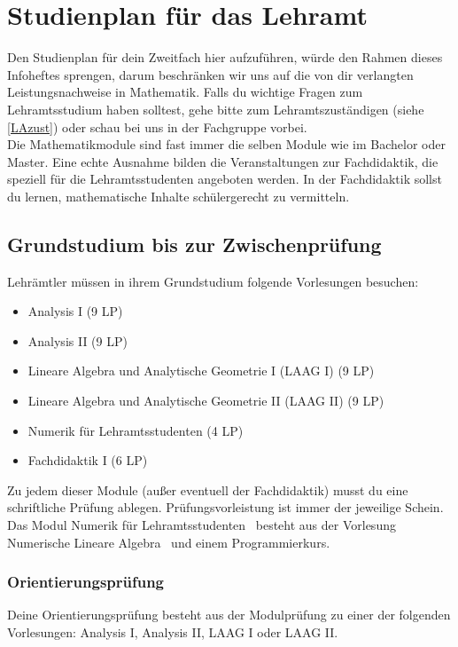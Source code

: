 \section{Studienplan für das Lehramt}
\label{LA}
Den Studienplan für dein Zweitfach
hier aufzuführen, würde den Rahmen
dieses Infoheftes sprengen,
darum beschränken wir uns auf die
von dir verlangten Leistungsnachweise in Mathematik.
Falls du wichtige Fragen zum Lehramtsstudium haben solltest,
gehe bitte zum Lehramtszuständigen (siehe \ref{LAzust})
oder schau bei uns in der Fachgruppe vorbei.\\

Die Mathematikmodule sind fast immer die selben Module
wie im Bachelor oder Master.
Eine echte Ausnahme bilden die Veranstaltungen zur Fachdidaktik,
die speziell für die Lehramtsstudenten angeboten werden.
In der Fachdidaktik sollst du lernen,
mathematische Inhalte schülergerecht zu vermitteln.


\subsection{Grundstudium bis zur Zwischenprüfung}

Lehrämtler müssen in ihrem Grundstudium folgende Vorlesungen besuchen:
\begin{itemize}
\item Analysis I (9 LP)
\item Analysis II (9 LP)
\item Lineare Algebra und Analytische Geometrie I (LAAG I) (9 LP)
\item Lineare Algebra und Analytische Geometrie II (LAAG II) (9 LP)
\item Numerik für Lehramtsstudenten (4 LP)
\item Fachdidaktik I (6 LP)
\end{itemize}

Zu jedem dieser Module (außer eventuell der Fachdidaktik)
musst du eine schriftliche Prüfung ablegen.
Prüfungsvorleistung ist immer der jeweilige Schein.
Das Modul \glqq Numerik für Lehramtsstudenten\grqq~
besteht aus der Vorlesung \glqq Numerische Lineare Algebra\grqq~
und einem Programmierkurs.

\subsubsection{Orientierungsprüfung}

Deine Orientierungsprüfung besteht aus der Modulprüfung
zu einer der folgenden Vorlesungen:
Analysis I, Analysis II, LAAG I oder LAAG II.


